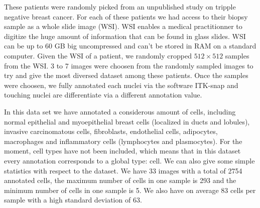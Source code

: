 \documentclass{article}
\begin{document}
These patients were randomly picked from an unpublished study on
tripple negative breast cancer. For each of these patients we had access
to their biopsy sample as a whole slide image (WSI). WSI enables a
medical practitionner to digitize the huge amount of information that
can be found in glass slides. WSI can be up to 60 GB big
uncompressed and can't be stored in RAM on a standard computer. Given
the WSI of a patient, we randomly cropped $512 \times 512$ samples 
from the WSI. %
3 to 7 images were choosen from the randomly sampled images to try and give the most diversed dataset among these patients. Once the samples were choosen, we fully annotated each nuclei via the software ITK-snap and touching nuclei are differentiate via a different annotation value.

In this data set we have annotated a considerous amount of cells,
including normal epithelial and myoepithelial breast cells (localized in
ducts and lobules), invasive carcinomatous cells, fibroblasts, endothelial
cells, adipocytes, macrophages and
inflammatory cells (lymphocytes and plasmocytes). For the moment, cell 
types have not been included, which means that in this dataset every annotation corresponds to a global type: cell. We can also give some simple statistics with respect to the dataset. We have 33 images with a total of 2754 annotated cells, the maximum number of cells in one sample is 293 and the minimum number of cells in one sample is 5. We also have on average 83 cells per sample with a high standard deviation of 63.

\end{document}
